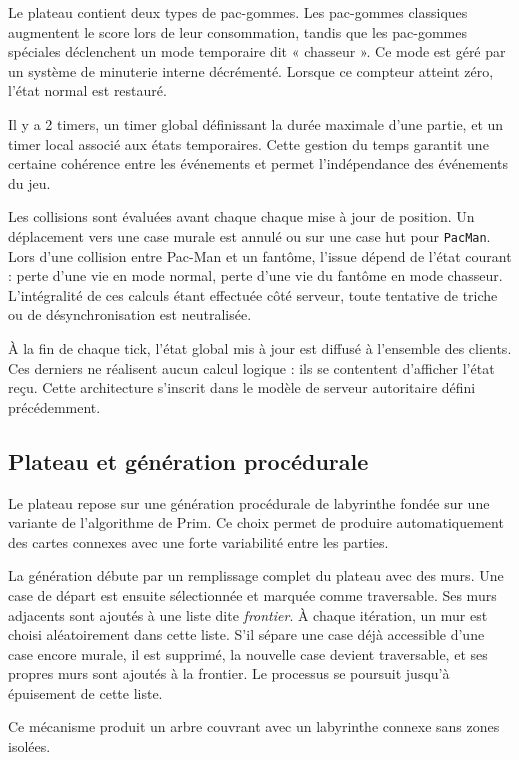 \documentclass[a4paper, 11pt]{report}
\begin{document}
Le plateau contient deux types de pac-gommes. 
Les pac-gommes classiques augmentent le score lors de leur consommation, tandis que les pac-gommes spéciales déclenchent un mode temporaire dit « chasseur ». 
Ce mode est géré par un système de minuterie interne décrémenté. 
Lorsque ce compteur atteint zéro, l’état normal est restauré.

Il y a 2 timers, un timer global définissant la durée maximale d’une partie, et un timer local associé aux états temporaires. 
Cette gestion du temps garantit une certaine cohérence entre les événements et permet l'indépendance des événements du jeu.

Les collisions sont évaluées avant chaque chaque mise à jour de position. 
Un déplacement vers une case murale est annulé ou sur une case hut pour \texttt{PacMan}. 
Lors d’une collision entre Pac-Man et un fantôme, l’issue dépend de l’état courant : perte d’une vie en mode normal, perte d’une vie du fantôme en mode chasseur. 
L’intégralité de ces calculs étant effectuée côté serveur, toute tentative de triche ou de désynchronisation est neutralisée.

À la fin de chaque tick, l’état global mis à jour est diffusé à l’ensemble des clients. 
Ces derniers ne réalisent aucun calcul logique : ils se contentent d’afficher l’état reçu. 
Cette architecture s’inscrit dans le modèle de serveur autoritaire défini précédemment.

\subsection{Plateau et génération procédurale}

Le plateau repose sur une génération procédurale de labyrinthe fondée sur une variante de l’algorithme de Prim. 
Ce choix permet de produire automatiquement des cartes connexes avec une forte variabilité entre les parties.

La génération débute par un remplissage complet du plateau avec des murs. 
Une case de départ est ensuite sélectionnée et marquée comme traversable. 
Ses murs adjacents sont ajoutés à une liste dite \textit{frontier}. 
À chaque itération, un mur est choisi aléatoirement dans cette liste. 
S’il sépare une case déjà accessible d’une case encore murale, il est supprimé, la nouvelle case devient traversable, et ses propres murs sont ajoutés à la frontier. 
Le processus se poursuit jusqu’à épuisement de cette liste.

Ce mécanisme produit un arbre couvrant avec un labyrinthe connexe sans zones isolées.
\end{document}
